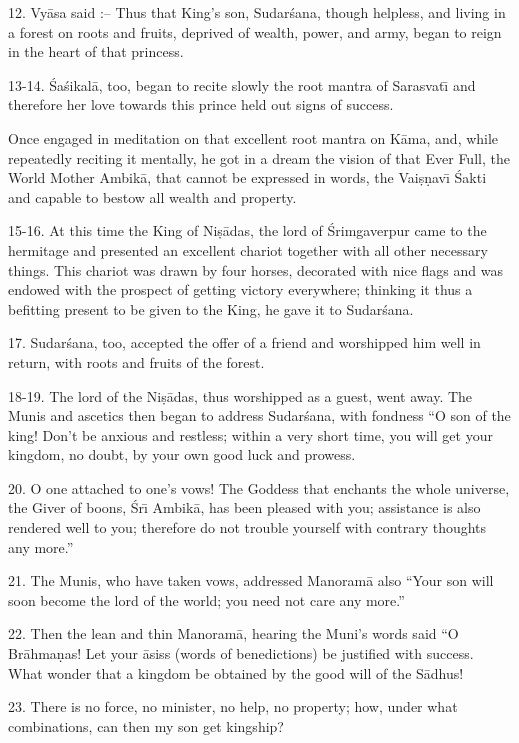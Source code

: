 12. Vy\=asa said :-- Thus that King's son, Sudar\'sana, though helpless, and living in a forest on roots and fruits, deprived of wealth, power, and army, began to reign in the heart of that princess.

13-14. \'Sa\'sikal\=a, too, began to recite slowly the root mantra of Sarasvat\={\i} and therefore her love towards this prince held out signs of success.

Once engaged in meditation on that excellent root mantra on K\=ama, and, while repeatedly reciting it mentally, he got in a dream the vision of that Ever Full, the World Mother Ambik\=a, that cannot be expressed in words, the Vai\d{s}\d{n}av\={\i} \'Sakti and capable to bestow all wealth and property.

15-16. At this time the King of Ni\d{s}\=adas, the lord of \'Srimgaverpur came to the hermitage and presented an excellent chariot together with all other necessary things. This chariot was drawn by four horses, decorated with nice flags and was endowed with the prospect of getting victory everywhere; thinking it thus a befitting present to be given to the King, he gave it to Sudar\'sana.

17. Sudar\'sana, too, accepted the offer of a friend and worshipped him well in return, with roots and fruits of the forest.

18-19. The lord of the Ni\d{s}\=adas, thus worshipped as a guest, went away. The Munis and ascetics then began to address Sudar\'sana, with fondness ``O son of the king! Don't be anxious and restless; within a very short time, you will get your kingdom, no doubt, by your own good luck and prowess.

20. O one attached to one's vows! The Goddess that enchants the whole universe, the Giver of boons, \'Sr\={\i} Ambik\=a, has been pleased with you; assistance is also rendered well to you; therefore do not trouble yourself with contrary thoughts any more.''

21. The Munis, who have taken vows, addressed Manoram\=a also ``Your son will soon become the lord of the world; you need not care any more.''

22. Then the lean and thin Manoram\=a, hearing the Muni's words said ``O Br\=ahma\d{n}as! Let your \=asiss (words of benedictions) be justified with success. What wonder that a kingdom be obtained by the good will of the S\=adhus!

23. There is no force, no minister, no help, no property; how, under what combinations, can then my son get kingship?

